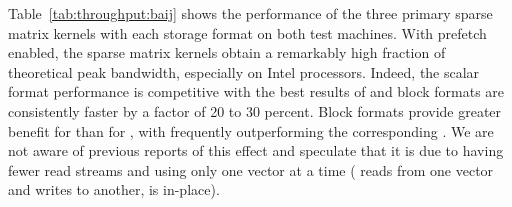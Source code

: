 Table~\ref{tab:throughput:baij} shows the performance of the three primary sparse matrix kernels with each storage format on both test machines.
With prefetch enabled, the sparse matrix kernels obtain a remarkably high fraction of theoretical peak bandwidth, especially on Intel processors.
Indeed, the scalar format performance is competitive with the best {\MatMult} results of \cite{williams2007osm} and block formats are consistently faster by a factor of 20 to 30 percent.
Block formats provide greater benefit for {\MatSolve} than for {\MatMult}, with {\BAIJ} {\MatSolve} frequently outperforming the corresponding {\MatMult}.
We are not aware of previous reports of this effect and speculate that it is due to {\MatSolve} having fewer read streams and using only one vector at a time ({\MatMult} reads from one vector and writes to another, {\MatSolve} is in-place).

